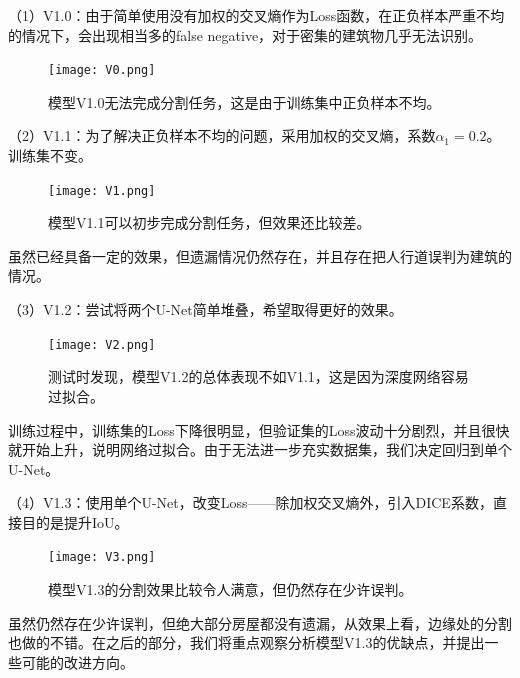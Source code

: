 \documentclass[a4paper,12pt]{article}
\begin{document}
\begin{CJK*}{UTF8}{gbsn}
\begin{spacing}{1.2}
    （1）V1.0：由于简单使用没有加权的交叉熵作为Loss函数，在正负样本严重不均的情况下，会出现相当多的false negative，对于密集的建筑物几乎无法识别。
    \begin{figure} [!]
    \centering
    \texttt{[image: V0.png]}
    \caption{模型V1.0无法完成分割任务，这是由于训练集中正负样本不均。}
    \label{fig:Fig 3}
    \end{figure}
    
    （2）V1.1：为了解决正负样本不均的问题，采用加权的交叉熵，系数$\alpha_{1}=0.2$。训练集不变。
    \begin{figure} [!]
    \centering
    \texttt{[image: V1.png]}
    \caption{模型V1.1可以初步完成分割任务，但效果还比较差。}
    \label{fig:Fig 3}
    \end{figure}
    虽然已经具备一定的效果，但遗漏情况仍然存在，并且存在把人行道误判为建筑的情况。
    
    （3）V1.2：尝试将两个U-Net简单堆叠，希望取得更好的效果。
    \begin{figure} [!]
    \centering
    \texttt{[image: V2.png]}
    \caption{测试时发现，模型V1.2的总体表现不如V1.1，这是因为深度网络容易过拟合。}
    \label{fig:Fig 3}
    \end{figure}

    训练过程中，训练集的Loss下降很明显，但验证集的Loss波动十分剧烈，并且很快就开始上升，说明网络过拟合。由于无法进一步充实数据集，我们决定回归到单个U-Net。
    
    （4）V1.3：使用单个U-Net，改变Loss——除加权交叉熵外，引入DICE系数，直接目的是提升IoU。
    \begin{figure} [!]
    \centering
    \texttt{[image: V3.png]}
    \caption{模型V1.3的分割效果比较令人满意，但仍然存在少许误判。}
    \label{fig:Fig 3}
    \end{figure}
    
    虽然仍然存在少许误判，但绝大部分房屋都没有遗漏，从效果上看，边缘处的分割也做的不错。在之后的部分，我们将重点观察分析模型V1.3的优缺点，并提出一些可能的改进方向。
    




\end{spacing}
\end{CJK*}
\end{document}
